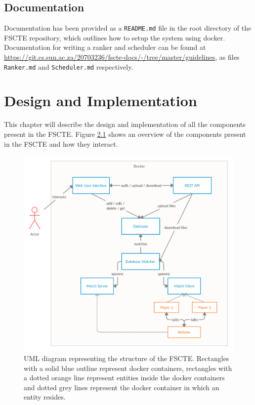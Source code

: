\documentclass[a4paper, 11pt]{report}
\begin{document}
\section{Documentation}

Documentation has been provided as a \texttt{README.md} file in the root directory
of the FSCTE repository, which outlines how to setup the system using docker.
Documentation for writing a ranker and scheduler can be found at
\url{https://git.cs.sun.ac.za/20703236/fscte-docs/-/tree/master/guidelines},
as files \texttt{Ranker.md} and \texttt{Scheduler.md} respectively.

\chapter{Design and Implementation}
\label{chap:design}

This chapter will describe the design and implementation of all the components
present in the FSCTE. Figure \ref{fig:uml-structure} shows an overview of the
components present in the FSCTE and how they interact.
\begin{figure}[H]
	\centering
	\includegraphics[scale=0.238]{uml-structure.png}
	\caption{UML diagram representing the structure of the FSCTE. Rectangles
	with a solid blue outline represent docker containers, rectangles with a
	dotted orange line represent entities inside the docker containers and dotted
	grey lines represent the docker container in which an entity resides.}
	\label{fig:uml-structure}
\end{figure}
\end{document}
